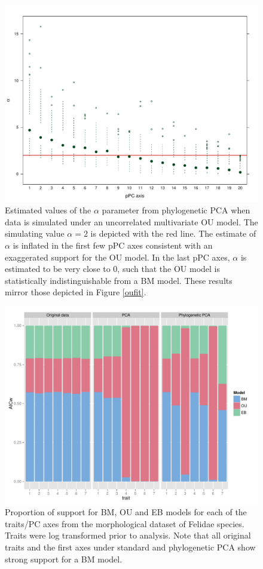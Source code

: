 \documentclass[a4paper,11pt]{article}
\begin{document}
\begin{figure}[p]
\centering
\includegraphics[scale=0.65]{fig/alpha-est.pdf}
\caption{Estimated values of the $\alpha$ parameter from phylogenetic PCA when data is simulated under an uncorrelated multivariate OU model. The simulating value $\alpha=$2 is depicted with the red line. The estimate of $\alpha$ is inflated in the first few pPC axes consistent with an exaggerated support for the OU model. In the last pPC axes, $\alpha$ is estimated to be very close to 0, such that the OU model is statistically indistinguishable from a BM model. These results mirror those depicted in Figure \ref{oufit}.}
\label{alpha}
\end{figure}

\begin{figure}[p]
\centering
\includegraphics[scale=0.65]{fig/felidae_aicw.pdf}
\caption{Proportion of support for BM, OU and EB models for each of the traits/PC axes from the morphological dataset of Felidae species. Traits were log transformed prior to analysis. Note that all original traits and the first axes under standard and phylogenetic PCA show strong support for a BM model.}
\label{felidae.aicw}
\end{figure}
\end{document}
